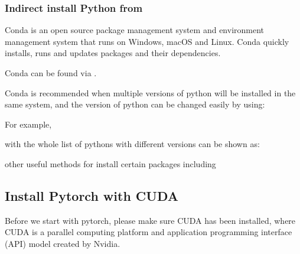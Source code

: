 \documentclass[letterpaper,10pt,english]{sphinxmanual}
\begin{document}
\subsubsection{Indirect install Python from }
\label{\detokenize{usage/installation:indirect-install-python-from-conda}}
Conda is an open source package management system and environment management system that runs on Windows, macOS and Linux. Conda quickly installs, runs and updates packages and their dependencies.

Conda can be found via .

Conda is recommended when multiple versions of python will be installed in the same system, and the version of python can be changed easily by using:

%
\begin{sphinxVerbatim}[commandchars=\\\{\}]
\end{sphinxVerbatim}

For example,

%
\begin{sphinxVerbatim}[commandchars=\\\{\}]
\end{sphinxVerbatim}

with the whole list of pythons with different versions can be shown as:

%
\begin{sphinxVerbatim}[commandchars=\\\{\}]
\end{sphinxVerbatim}

other useful methods for install certain packages including

%
\begin{sphinxVerbatim}[commandchars=\\\{\}]
\end{sphinxVerbatim}


\subsection{Install Pytorch with CUDA}
\label{\detokenize{usage/installation:install-pytorch-with-cuda}}
Before we start with pytorch, please make sure CUDA has been installed, where
CUDA is a parallel computing platform and application programming interface (API) model created by Nvidia.
\end{document}
